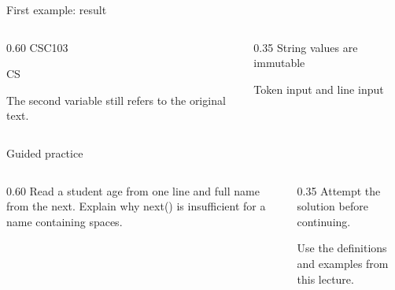 \documentclass[10pt,aspectratio=169]{beamer}
\begin{document}
\begin{frame}[fragile,t]{First example: result}
\begin{columns}[T,onlytextwidth]\begin{column}{0.60\textwidth}
CSC103\par CS\par The second variable still refers to the original text.
\end{column}\begin{column}{0.35\textwidth}\small
String values are immutable

Token input and line input
\end{column}\end{columns}
\end{frame}

\begin{frame}[fragile,t]{Guided practice}
\begin{columns}[T,onlytextwidth]\begin{column}{0.60\textwidth}
Read a student age from one line and full name from the next. Explain why next() is insufficient for a name containing spaces.
\end{column}\begin{column}{0.35\textwidth}\small
Attempt the solution before continuing.

Use the definitions and examples from this lecture.
\end{column}\end{columns}
\end{frame}
\end{document}

